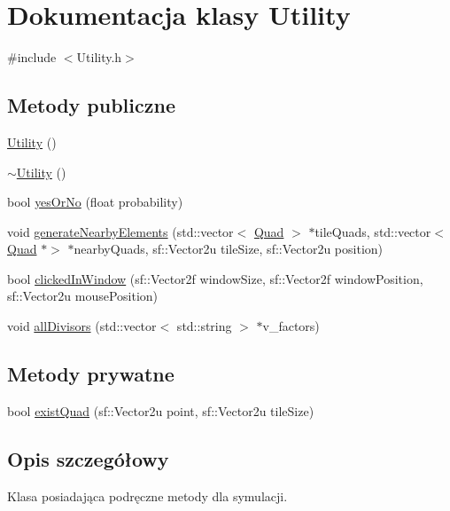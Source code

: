 \hypertarget{class_utility}{}\section{Dokumentacja klasy Utility}
\label{class_utility}


{\ttfamily \#include $<$Utility.\+h$>$}

\subsection*{Metody publiczne}
\begin{DoxyCompactItemize}
\item 
\mbox{\hyperlink{class_utility_ac7af3e1642ac8d53ef180180a08fbd00}{Utility}} ()
\item 
\mbox{\hyperlink{class_utility_aecfe4b31e39b00555158a2d8288b874a}{$\sim$\+Utility}} ()
\item 
bool \mbox{\hyperlink{class_utility_a1737e13071619724884c55559c34d727}{yes\+Or\+No}} (float probability)
\item 
void \mbox{\hyperlink{class_utility_ae89bf9504ce0848783234853483da262}{generate\+Nearby\+Elements}} (std\+::vector$<$ \mbox{\hyperlink{class_quad}{Quad}} $>$ $\ast$tile\+Quads, std\+::vector$<$ \mbox{\hyperlink{class_quad}{Quad}} $\ast$$>$ $\ast$nearby\+Quads, sf\+::\+Vector2u tile\+Size, sf\+::\+Vector2u position)
\item 
bool \mbox{\hyperlink{class_utility_a535e980c2716b8118deb78bef51079da}{clicked\+In\+Window}} (sf\+::\+Vector2f window\+Size, sf\+::\+Vector2f window\+Position, sf\+::\+Vector2u mouse\+Position)
\item 
void \mbox{\hyperlink{class_utility_a8aafe3b77344b4d230c431cbd64b09dc}{all\+Divisors}} (std\+::vector$<$ std\+::string $>$ $\ast$v\+\_\+factors)
\end{DoxyCompactItemize}
\subsection*{Metody prywatne}
\begin{DoxyCompactItemize}
\item 
bool \mbox{\hyperlink{class_utility_a65721c1ad255c50823139ad357212a13}{exist\+Quad}} (sf\+::\+Vector2u point, sf\+::\+Vector2u tile\+Size)
\end{DoxyCompactItemize}


\subsection{Opis szczegółowy}
Klasa posiadająca podręczne metody dla symulacji. 

